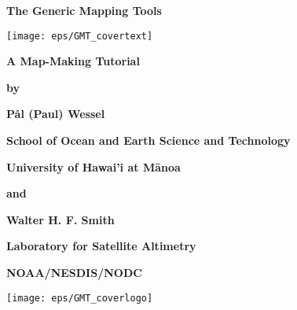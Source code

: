 \documentclass{report}
\begin{document}

\pagestyle{headings}

\thispagestyle{empty}

\begin{center}
\huge
\textbf{The Generic Mapping Tools}\par 
\vspace{0.5\baselineskip}

\texttt{[image: eps/GMT\_covertext]} 

\Huge
\textbf{\GMTDOCVERSION}\par 
\vspace{0.25\baselineskip}

\huge
\textbf{A Map-Making Tutorial}\par 

\large
\vspace{0.75\baselineskip}
\textbf{by}\par 
\vspace{0.75\baselineskip}

\huge
\textbf{P\aa l (Paul) Wessel}\par 
\vspace{0.5\baselineskip}

\Large
\textbf{School of Ocean and Earth Science and Technology}\par 
\textbf{University of Hawai'i at M\={a}noa}\par 

\large
\vspace{0.75\baselineskip}
\textbf{and}\par 
\vspace{0.75\baselineskip}

\huge
\textbf{Walter H. F. Smith}\par 
\vspace{0.5\baselineskip}

\Large
\textbf{Laboratory for Satellite Altimetry}\par 
\textbf{NOAA/NESDIS/NODC}\par 
\vspace{0.5\baselineskip}

\large
\textbf{\GMTDOCDATE}\par 
\vspace{\baselineskip}

\texttt{[image: eps/GMT\_coverlogo]}

\end{center}
\clearpage
\end{document}
